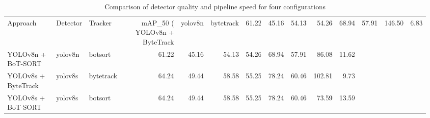 \begin{table}
\caption{Comparison of detector quality and pipeline speed for four configurations}
\label{tab:models_comparison_dev}
\begin{tabular}{lllrrrrrrrr}
\toprule
Approach & Detector & Tracker & mAP_50 (%
\midrule
YOLOv8n + ByteTrack & yolov8n & bytetrack & 61.22 & 45.16 & 54.13 & 54.26 & 68.94 & 57.91 & 146.50 & 6.83 \\
YOLOv8n + BoT-SORT & yolov8n & botsort & 61.22 & 45.16 & 54.13 & 54.26 & 68.94 & 57.91 & 86.08 & 11.62 \\
YOLOv8s + ByteTrack & yolov8s & bytetrack & 64.24 & 49.44 & 58.58 & 55.25 & 78.24 & 60.46 & 102.81 & 9.73 \\
YOLOv8s + BoT-SORT & yolov8s & botsort & 64.24 & 49.44 & 58.58 & 55.25 & 78.24 & 60.46 & 73.59 & 13.59 \\
\bottomrule
\end{tabular}
\end{table}
